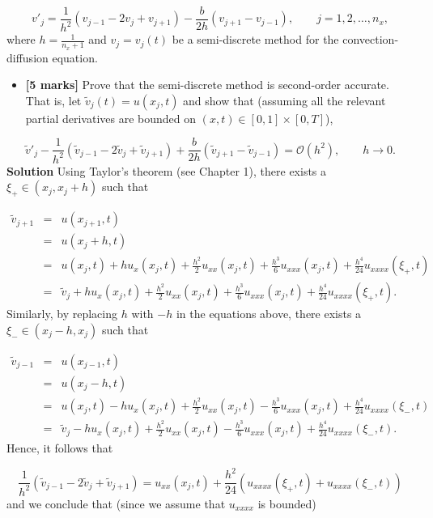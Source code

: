 \documentclass[12pt,a4paper]{article}
\begin{document}
\[
v'_j = \frac{1}{h^2}\left(v_{j-1} - 2v_j + v_{j+1}   \right) - \frac{b}{2h}\left(v_{j+1}  - v_{j-1}   \right), \qquad j =  1, 2,  \ldots, n_x,
\]
where $h = \displaystyle{\frac{1}{n_x + 1}}$ and $v_j = v_j(t)$ be a semi-discrete method for the convection-diffusion equation.

\begin{itemize}
\item[5. ] \textbf{[5 marks]} Prove that the semi-discrete method is second-order accurate.  That is, let $\widetilde{v}_j(t) =  u(x_j,t)$ and show that (assuming all the relevant partial derivatives are bounded on $(x,t) \in [0, 1]\times [0, T]$),

\end{itemize}
\[
\widetilde{v}'_j - \frac{1}{h^2}\left(\widetilde{v}_{j-1} - 2\widetilde{v}_j + \widetilde{v}_{j+1}   \right) + \frac{b}{2h}\left(\widetilde{v}_{j+1}  - \widetilde{v}_{j-1}   \right) = \mathcal{O}\left(h^2 \right), \qquad h \to 0.
\]
\textbf{Solution}  Using Taylor's theorem (see Chapter 1), there exists a $\xi_+ \in (x_j, x_j + h)$  such that


\begin{eqnarray*}
\widetilde{v}_{j + 1} &=& u(x_{j+1},t) \\
&=&u(x_j + h,t) \\
&=& u(x_j,t) +  hu_x(x_j,t) + \frac{h^2}{2}u_{xx}(x_j,t) + \frac{h^3}{6}u_{xxx}(x_j,t) + \frac{h^4}{24}u_{xxxx} (\xi_+,t) \\
&=& \widetilde{v}_{j} +  hu_x(x_j,t) + \frac{h^2}{2}u_{xx}(x_j,t) + \frac{h^3}{6}u_{xxx}(x_j,t) + \frac{h^4}{24}u_{xxxx} (\xi_+,t).
\end{eqnarray*}
Similarly, by replacing $h$ with $-h$ in the equations above,  there exists a $\xi_- \in (x_j - h, x_j)$  such that


\begin{eqnarray*}
\widetilde{v}_{j - 1} &=& u(x_{j-1},t) \\
&=&u(x_j - h,t) \\
&=& u(x_j,t) -  hu_x(x_j,t) + \frac{h^2}{2}u_{xx}(x_j,t) - \frac{h^3}{6}u_{xxx}(x_j,t) + \frac{h^4}{24}u_{xxxx} (\xi_-,t) \\
&=& \widetilde{v}_{j} -  hu_x(x_j,t) + \frac{h^2}{2}u_{xx}(x_j,t) - \frac{h^3}{6}u_{xxx}(x_j,t) + \frac{h^4}{24}u_{xxxx} (\xi_-,t).
\end{eqnarray*}
Hence, it follows that


\begin{equation*}
\frac{1}{h^2}\left(\widetilde{v}_{j-1} - 2\widetilde{v}_j + \widetilde{v}_{j+1}   \right) = u_{xx}(x_j,t) + \frac{h^2}{24}\left(u_{xxxx} (\xi_+,t) + u_{xxxx} (\xi_-,t)  \right)
\end{equation*}
and we conclude that (since we assume that $u_{xxxx}$ is bounded)
\end{document}
